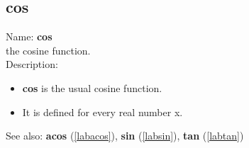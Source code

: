 \subsection{cos}
\label{labcos}
\noindent Name: \textbf{cos}\\
the cosine function.\\
\noindent Description: \begin{itemize}

\item \textbf{cos} is the usual cosine function.

\item It is defined for every real number x.
\end{itemize}
See also: \textbf{acos} (\ref{labacos}), \textbf{sin} (\ref{labsin}), \textbf{tan} (\ref{labtan})
